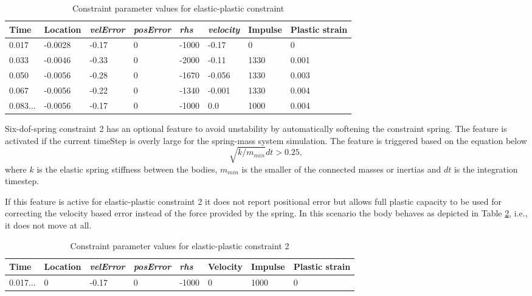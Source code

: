 \begin {table}[htb!]
\caption {Constraint parameter values for elastic-plastic constraint} 
\label{tab:epBlockValues} 
\begin{center}
\begin{tabular}{|l|l| l| l|l|l|l|l|}
\hline
{\bf Time} & 
{\bf Location} &
{\it velError} & {\it posError} & {\it rhs} &
{\it velocity} & 
{\bf Impulse} & 
{\bf Plastic strain} \\  \hline
0.017 & -0.0028 &-0.17 & 0 & -1000 & -0.17 & 0 & 0 \\  \hline
0.033 & -0.0046 &-0.33 & 0 & -2000 & -0.11 &  1330 & 0.001 \\  \hline
0.050 & -0.0056 &-0.28 & 0 & -1670 & -0.056 &  1330 & 0.003 \\  \hline
0.067 & -0.0056 &-0.22 & 0 & -1340 &  -0.001&  1330 & 0.004\\  \hline
0.083... & -0.0056  & -0.17 & 0 & -1000 &  0.0&  1000 & 0.004\\  \hline
\end {tabular}
\end{center}
\end {table}

Six-dof-spring constraint 2 has an optional feature to avoid unstability by automatically softening the constraint
spring. The feature is activated if the current timeStep is overly large for the spring-mass system simulation.
The feature is triggered based on the equation below 
\begin{equation} \label{eq:frequencyLimited}
\sqrt{ k /  m_{min}} dt > 0.25, 
\end{equation}
where $k$ is the elastic spring stiffness between the bodies,
$m_{min}$ is the smaller of the connected masses or inertias and $dt$ is the integration timestep.

If this feature is active for elastic-plastic constraint 2   
it does not report positional error but  allows full plastic capacity to be used for correcting
the velocity based error instead of the force provided by the spring.
In this scenario the body behaves as depicted in Table \ref{tab:ep2BlockValues}, i.e., it does not move at all.

\begin {table}[htb!]
\caption {Constraint parameter values for elastic-plastic constraint 2} 
\label{tab:ep2BlockValues} 
\begin{center}
\begin{tabular}{|l|l| l| l|l|l|l|l|}
\hline
{\bf Time} & 
{\bf Location} &
{\it velError} & {\it posError} & {\it rhs} &
{\bf Velocity} & 
{\bf Impulse} & 
{\bf Plastic strain} \\  \hline
0.017... &  0 & -0.17  & 0 & -1000 & 0       & 1000 & 0 \\  \hline
\end {tabular}
\end{center}
\end {table}

